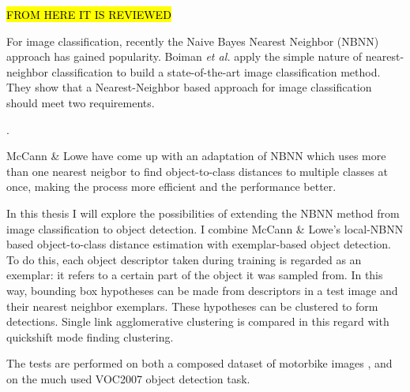 
\hl{FROM HERE IT IS REVIEWED}

For image classification, recently the Naive Bayes Nearest Neighbor (NBNN) \cite{boiman2008defense} approach has gained popularity.  Boiman \emph{et al.} apply the simple nature of nearest-neighbor classification to build a state-of-the-art image classification method. They show that a Nearest-Neighbor based approach for image classification should meet two requirements.

.

McCann \& Lowe \cite{mccann2011local} have come up with an adaptation of NBNN which uses more than one nearest neigbor to find object-to-class distances to multiple classes at once, making the process more efficient and the performance better. 

In this thesis I will explore the possibilities of extending the NBNN method from image classification to object detection. I combine McCann \& Lowe's local-NBNN based object-to-class distance estimation with exemplar-based object detection\cite{chum2007exemplar, becker2012codebook}. To do this, each object descriptor taken during training is regarded as an exemplar: it refers to a certain part of the object it was sampled from. In this way, bounding box hypotheses can be made from descriptors in a test image and their nearest neighbor exemplars. These hypotheses can be clustered to form detections. Single link agglomerative clustering is compared in this regard with quickshift mode finding clustering.

The tests are performed on both a composed dataset of motorbike images \cite{becker2012codebook}, and on the much used VOC2007 object detection task. \cite{pascal-voc-2007}

